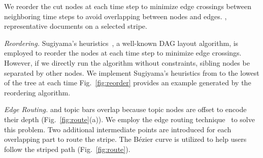 
We  reorder the cut nodes at each time step to minimize edge crossings between neighboring time steps   to avoid overlapping between nodes and edges. , representative documents  on a selected stripe.

\emph{\normalsize Reordering.} Sugiyama's heuristics~\cite{Sugiyama1981},  a well-known DAG layout algorithm, is employed to reorder the nodes at each time step to minimize edge crossings.
However, if we directly run the algorithm without constraints, sibling nodes  be separated by other nodes.
We implement Sugiyama's heuristics from   to the lowest  of the tree at each time 
Fig.~\ref{fig:reorder} provides an example generated by the reordering algorithm.

\emph{\normalsize Edge Routing.}  and topic bars  overlap because topic nodes are offset to encode their depth (Fig.~\ref{fig:route}(a)).
We employ the edge routing technique~\cite{Cui2008} to solve this problem.
Two additional intermediate points are introduced for each overlapping part to route the stripe.
The B\'{e}zier curve is utilized to help users follow the striped path (Fig.~\ref{fig:route}).

